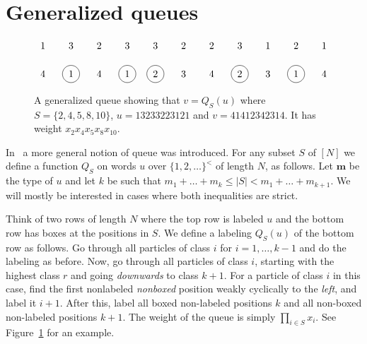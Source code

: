 \documentclass[reqno]{amsart}
\newcommand{\0}{\phantom{c}}
\newcommand{\mm}{\mathbf{m}}
\let\prodnonlimits\prod
\renewcommand{\prod}{\prodnonlimits\limits}
\theoremstyle{plain}
\theoremstyle{definition}
\numberwithin{equation}{section}
\begin{document}
\section{Generalized queues}

\begin{figure}
\label{fig_generalized_queue}
\[
\begin{tikzpicture}
  \node at  (1,2){1};
  \node at  (2,2){3};
  \node at  (3,2){2};
  \node at  (4,2){3};
  \node at  (5,2){3};
  \node at  (6,2){2};
  \node at  (7,2){2};
  \node at  (8,2){3};
  \node at  (9,2){1};
  \node at (10,2){2};
  \node at (11,2){1};

  \node at                     (1,1){4};
  \node[circle,draw=black] at  (2,1){1};
  \node at                     (3,1){4};
  \node[circle,draw=black] at  (4,1){1};
  \node[circle,draw=black] at  (5,1){2};
  \node at                     (6,1){3};
  \node at                     (7,1){4};
  \node[circle,draw=black] at  (8,1){2};
  \node at                     (9,1){3};
  \node[circle,draw=black] at (10,1){1};
  \node at                    (11,1){4};
\end{tikzpicture}
\]
\caption{A generalized queue showing that $v = Q_S(u)$ where $S = \{2,4,5,8,10\}$, $u = 13233223121$ and $v =41412342314$. It has weight $x_2x_4x_5x_8x_{10}$.}
\end{figure}

In~\cite{AAMP} a more general notion of queue was introduced. For any subset $S$ of $[N]$ we define a function $Q_S$ on words $u$ over $\{1, 2, \dots \}^<$ of length $N$, as follows.
Let $\mm$ be the type of $u$ and let $k$ be such that $m_1 + \dots + m_k \leq |S| < m_1 + \dots + m_{k+1}$. We will mostly be interested in cases where both inequalities are strict.

Think of two rows of length $N$ where the top row is labeled $u$ and the bottom row has boxes at the positions in $S$. We define a labeling $Q_S(u)$ of the bottom row as follows. Go through all particles of class $i$ for $i = 1, \dots, k-1$ and do the labeling as before. Now, go through all particles of class $i$, starting with the highest class $r$ and going \emph{downwards} to class $k+1$. For a particle of class $i$ in this case, find the first nonlabeled \emph{nonboxed} position weakly cyclically to the \emph{left}, and label it $i+1$.
After this, label all boxed non-labeled positions $k$ and all non-boxed non-labeled positions $k+1$.
The weight of the queue is simply $\prod_{i\in S} x_i$.
See Figure~\ref{fig_generalized_queue} for an example.
\end{document}
